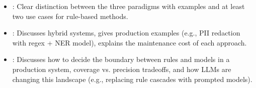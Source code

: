 \begin{interviewq}

\goodgreat
\begin{itemize}
    \item {}: Clear distinction between the three paradigms with examples and
    at least two use cases for rule-based methods.
    \item {}: Discusses hybrid systems, gives production examples (e.g., PII
    redaction with regex + NER model), explains the maintenance cost of each approach.
    \item {}: Discusses how to decide the boundary between rules and models in
    a production system, coverage vs. precision tradeoffs, and how LLMs are changing
    this landscape (e.g., replacing rule cascades with prompted models).
\end{itemize}

\end{interviewq}

\vspace{0.5em}

